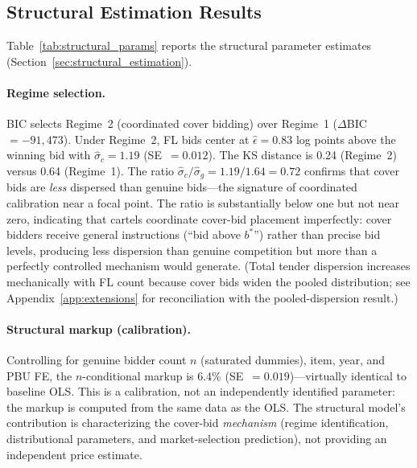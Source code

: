 


\subsection{Structural Estimation Results}
\label{sec:results_structural}

Table~\ref{tab:structural_params} reports the structural parameter
estimates (Section~\ref{sec:structural_estimation}).

\paragraph{Regime selection.}
BIC selects Regime~2 (coordinated cover bidding) over Regime~1
($\Delta$BIC~$= -91{,}473$). Under Regime~2, FL bids center at
$\hat{\epsilon} = 0.83$ log points above the winning bid with
$\hat{\sigma}_c = 1.19$ (SE~$= 0.012$). The KS distance is 0.24
(Regime~2) versus 0.64 (Regime~1). The ratio
$\hat{\sigma}_c / \hat{\sigma}_g = 1.19/1.64 = 0.72$ confirms that
cover bids are \emph{less} dispersed than genuine bids---the signature
of coordinated calibration near a focal point. The ratio is
substantially below one but not near zero, indicating that cartels
coordinate cover-bid placement imperfectly: cover bidders receive
general instructions (``bid above $b^*$'') rather than precise bid
levels, producing less dispersion than genuine competition but more
than a perfectly controlled mechanism would generate.
(Total tender dispersion increases mechanically with FL count because cover bids widen the pooled distribution; see Appendix~\ref{app:extensions} for reconciliation with the pooled-dispersion result.)
\paragraph{Structural markup (calibration).}
Controlling for genuine bidder count $n$ (saturated dummies), item,
year, and PBU FE, the $n$-conditional markup is 6.4\%
(SE~$= 0.019$)---virtually identical to baseline OLS. This is a
calibration, not an independently identified parameter: the markup
is computed from the same data as the OLS. The structural model's
contribution is characterizing the cover-bid \emph{mechanism}
(regime identification, distributional parameters, and market-selection
prediction), not providing an independent price estimate.





